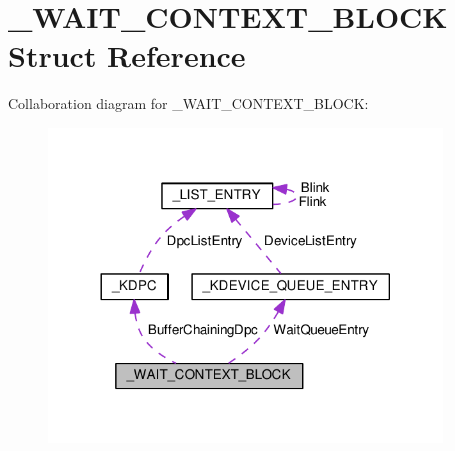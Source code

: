 \hypertarget{struct__WAIT__CONTEXT__BLOCK}{}\section{\+\_\+\+W\+A\+I\+T\+\_\+\+C\+O\+N\+T\+E\+X\+T\+\_\+\+B\+L\+O\+C\+K Struct Reference}
\label{struct__WAIT__CONTEXT__BLOCK}


Collaboration diagram for \+\_\+\+W\+A\+I\+T\+\_\+\+C\+O\+N\+T\+E\+X\+T\+\_\+\+B\+L\+O\+C\+K\+:
\nopagebreak
\begin{figure}[H]
\begin{center}
\leavevmode
\includegraphics[width=296pt]{struct__WAIT__CONTEXT__BLOCK__coll__graph}
\end{center}
\end{figure}
